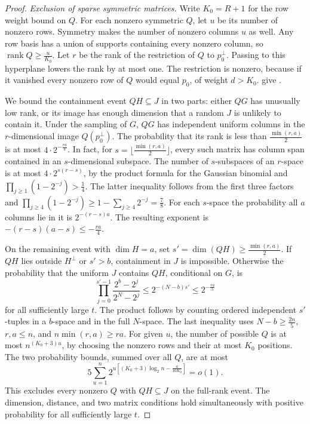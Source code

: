 \documentclass[aps,prl,reprint,longbibliography,nofootinbib,nobibnotes]{revtex4-2}
\newif\ifshowchanges
\DeclareRobustCommand{\rev}[1]{\leavevmode{\ifshowchanges\color{RevisionPurple}%
  \hypersetup{allcolors=RevisionPurple}\fi #1%
  \ifhmode\xdef\revspacefactor{\the\spacefactor}%
    \aftergroup\revrestorespacefactor\fi}}
\newcommand{\revrestorespacefactor}{\ifhmode\spacefactor\revspacefactor\relax\fi}
\begin{document}
\begin{proof}
\emph{Exclusion of sparse symmetric matrices.}
Write $K_0=R+1$ for the row weight bound on $Q$. For each nonzero symmetric $Q$, let $u$ be its
number of nonzero rows. Symmetry makes the number of nonzero columns $u$ as well. Any row basis has
a union of supports containing every nonzero column, so $\operatorname{rank}Q\ge \frac{u}{K_0}$.
Let $r$ be the rank of the restriction of $Q$ to $p_0^\perp$. Passing to this hyperplane lowers the
rank by at most one. The restriction is nonzero, because if it vanished every nonzero row of $Q$
would equal $p_0$, of weight $d>K_0$. \rev{Together these bounds} give \rev{$r\ge\max\{1,u/K_0-1\}\ge u/(2K_0)$}.

We bound the containment event $QH\subseteq J$ in two parts: either $QG$ has unusually low rank, or
its image has enough dimension that a random $J$ is unlikely to contain it. Under the sampling of
$G$, $QG$ has independent uniform columns in the $r$-dimensional image $Q(p_0^\perp)$. The
probability that its rank is less than $\frac{\min(r,a)}{2}$ is at most $4\cdot2^{-\frac{ra}{4}}$.
In fact, for $s=\lfloor\frac{\min(r,a)}{2}\rfloor$, every such matrix has column span contained in
an $s$-dimensional subspace. The number of $s$-subspaces of an $r$-space is at most
$4\cdot2^{s(r-s)}$, by the product formula for the Gaussian binomial and
$\prod_{j\ge1}(1-2^{-j})>\frac{1}{4}$. The latter inequality follows from the first three factors
and $\prod_{j\ge4}(1-2^{-j})\ge1-\sum_{j\ge4}2^{-j}=\frac{7}{8}$. For each $s$-space the
probability all $a$ columns lie in it is $2^{-(r-s)a}$. The resulting exponent is
$-(r-s)(a-s)\le-\frac{ra}{4}$.

On the remaining event with $\dim H=a$, set $s'=\dim(QH)\ge\frac{\min(r,a)}{2}$. If $QH$ lies
outside $H^\perp$ or $s'>b$, containment in $J$ is impossible. Otherwise the probability that the
uniform $J$ contains $QH$, conditional on $G$, is
\[
 \prod_{j=0}^{s'-1}\frac{2^b-2^j}{2^N-2^j}
 \le 2^{-(N-b)s'}
 \le 2^{-\frac{ra}{5}}
\]
for all sufficiently large $t$. The product follows by counting ordered independent $s'$-tuples in
a $b$-space and in the full $N$-space. The last inequality uses $N-b\ge\frac{2n}{5}$, $r,a\le n$,
and $n\min(r,a)\ge ra$. For given $u$, the number of possible $Q$ is at most $n^{(K_0+3)u}$, by
choosing the nonzero rows and their at most $K_0$ positions. The two probability bounds, summed
over all $Q$, are at most
\[
 5\sum_{u=1}^n
 2^{u[(K_0+3)\log_2 n-\frac{a}{10K_0}]}=o(1).
\]
This excludes every nonzero $Q$ with $QH\subseteq J$ on the full-rank event. The dimension,
distance, and two matrix conditions hold simultaneously with positive probability for all
sufficiently large $t$.
\end{proof}
\end{document}
